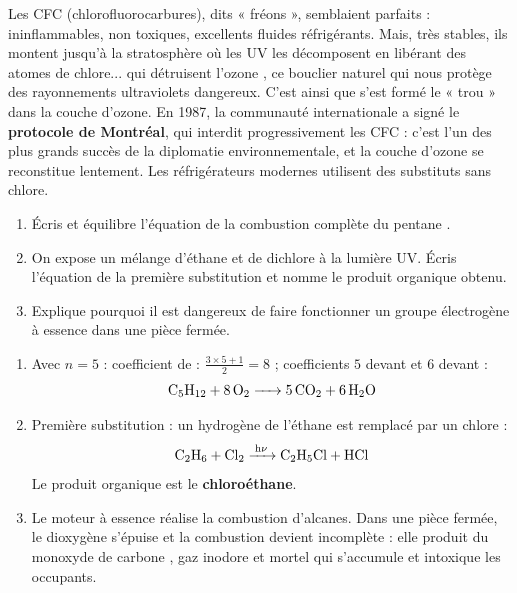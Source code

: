 \documentclass[11pt]{article}
\newcommand{\cle}[1]{{\popxbold\color{popdark}#1}}
\begin{document}
\begin{savaistu}
Les CFC (chlorofluorocarbures), dits « fréons », semblaient parfaits : ininflammables, non toxiques, excellents fluides réfrigérants. Mais, très stables, ils montent jusqu'à la stratosphère où les UV les décomposent en libérant des atomes de chlore... qui détruisent l'\cle{ozone} , ce bouclier naturel qui nous protège des rayonnements ultraviolets dangereux. C'est ainsi que s'est formé le « trou » dans la couche d'ozone. En 1987, la communauté internationale a signé le \textbf{protocole de Montréal}, qui interdit progressivement les CFC : c'est l'un des plus grands succès de la diplomatie environnementale, et la couche d'ozone se reconstitue lentement. Les réfrigérateurs modernes utilisent des substituts sans chlore.
\end{savaistu}

\begin{exercice}
\begin{enumerate}
\item Écris et équilibre l'équation de la combustion complète du pentane .
\item On expose un mélange d'éthane  et de dichlore à la lumière UV. Écris l'équation de la première substitution et nomme le produit organique obtenu.
\item Explique pourquoi il est dangereux de faire fonctionner un groupe électrogène à essence dans une pièce fermée.
\end{enumerate}
\end{exercice}

\begin{corrige}[Exercice]
\begin{enumerate}
\item Avec $n = 5$ : coefficient de  : $\frac{3\times 5+1}{2} = 8$ ; coefficients $5$ devant  et $6$ devant  :
\[ \ce{C5H12 + 8 O2 -> 5 CO2 + 6 H2O} \]
\item Première substitution : un hydrogène de l'éthane est remplacé par un chlore :
\[ \ce{C2H6 + Cl2 ->[h\nu] C2H5Cl + HCl} \]
Le produit organique est le \textbf{chloroéthane}.
\item Le moteur à essence réalise la combustion d'alcanes. Dans une pièce fermée, le dioxygène s'épuise et la combustion devient incomplète : elle produit du monoxyde de carbone , gaz inodore et mortel qui s'accumule et intoxique les occupants.
\end{enumerate}
\end{corrige}
\end{document}
